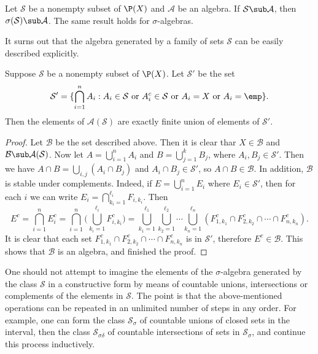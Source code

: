 \begin{lemma}\label{sigma alg generate lem}
Let $\mathcal{S}$ be a nonempty subset of $\P(X)$ and $\mathcal{A}$ be an algebra. If $\mathcal{S}\sub\mathcal{A}$, then $\sigma(\mathcal{S})\sub\mathcal{A}$. 
The same result holds for $\sigma$-algebras.
\end{lemma}
It surns out that the algebra generated by a family of sets $\mathcal{S}$ can be easily described explicitly. 
\begin{proposition}
Suppose $\mathcal{S}$ be a nonempty subset of $\P(X)$. Let $\mathcal{S}'$ be the set 
\[\mathcal{S}'=\{\bigcap_{i=1}^{n}A_i:A_i\in\mathcal{S}\text{ or }A_i^c\in\mathcal{S}\text{ or }A_i=X\text{ or }A_i=\emp\}.\]
Then the elements of $\mathcal{A}(\mathcal{S})$ are exactly finite union of elements of $\mathcal{S}'$.
\end{proposition}
\begin{proof}
Let $\mathcal{B}$ be the set described above. Then it is clear thar $X\in\mathcal{B}$ and $\mathcal{B}\sub\mathcal{A}(\mathcal{S})$. Now let $A=\bigcup_{i=1}^{n}A_i$ and $B=\bigcup_{j=1}^{k}B_j$, where $A_i,B_j\in\mathcal{S}'$. Then we have $A\cap B=\bigcup_{i,j}(A_i\cap B_j)$ and $A_i\cap B_j\in\mathcal{S}'$, so $A\cap B\in\mathcal{B}$. In addition, $\mathcal{B}$ is stable under complements. Indeed, if $E=\bigcup_{i=1}^{n}E_i$ where $E_i\in\mathcal{S}'$, then for each $i$ we can write $E_i=\bigcap_{k_i=1}^{\ell_i}F_{i,k_i}$. 
Then
\[E^c=\bigcap_{i=1}^{n}E_i^c=\bigcap_{i=1}^{n}\Big(\bigcup_{k_i=1}^{\ell_i}F^c_{i,k_i}\Big)=\bigcup_{k_1=1}^{\ell_1}\bigcup_{k_2=1}^{\ell_2}\cdots\bigcup_{k_n=1}^{\ell_n}(F_{1,k_1}^c\cap F_{2,k_2}^c\cap\cdots\cap F_{n,k_n}^c).\]
It is clear that each set $F_{1,k_1}^c\cap F_{2,k_2}^c\cap\cdots\cap F_{n,k_n}^c$ is in $\mathcal{S}'$, therefore $E^c\in\mathcal{B}$. This shows that $\mathcal{B}$ is an algebra, and finished the proof.
\end{proof}
One should not attempt to imagine the elements of the $\sigma$-algebra generated by the class $\mathcal{S}$ in a constructive form by means of countable unions, intersections or complements of the elements in $\mathcal{S}$. The point is that the above-mentioned operations can be repeated in an unlimited number of steps in any order. For example, one can form the class $\mathcal{S}_{\sigma}$ of countable unions of closed sets in the interval, then the class $\mathcal{S}_{\sigma\delta}$ of countable intersections of sets in $\mathcal{S}_{\sigma}$, and continue this process inductively.
